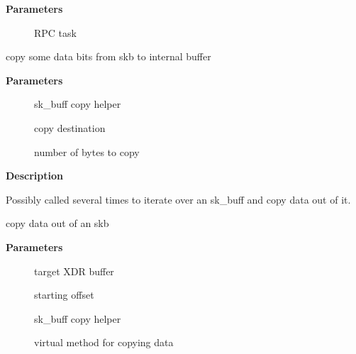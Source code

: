 \documentclass[a4paper,8pt,english]{sphinxmanual}
\begin{document}
\textbf{Parameters}
\begin{description}
\item[{}] \leavevmode
RPC task

\end{description}

\begin{fulllineitems}
\label{networking/kapi:c.xdr_skb_read_bits}
copy some data bits from skb to internal buffer

\end{fulllineitems}


\textbf{Parameters}
\begin{description}
\item[{}] \leavevmode
sk\_buff copy helper

\item[{}] \leavevmode
copy destination

\item[{}] \leavevmode
number of bytes to copy

\end{description}

\textbf{Description}

Possibly called several times to iterate over an sk\_buff and copy
data out of it.

\begin{fulllineitems}
\label{networking/kapi:c.xdr_partial_copy_from_skb}
copy data out of an skb

\end{fulllineitems}


\textbf{Parameters}
\begin{description}
\item[{}] \leavevmode
target XDR buffer

\item[{}] \leavevmode
starting offset

\item[{}] \leavevmode
sk\_buff copy helper

\item[{}] \leavevmode
virtual method for copying data

\end{description}
\end{document}
